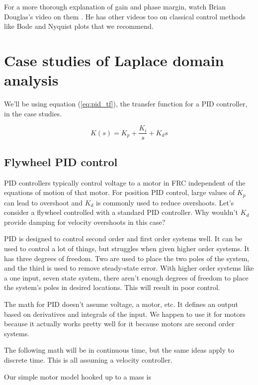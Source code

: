 For a more thorough explanation of gain and phase margin, watch Brian Douglas's
video on them \cite{bib:gain_phase_margin}. He has other videos too on classical
control methods like Bode and Nyquist plots that we recommend.

\section{Case studies of Laplace domain analysis}

We'll be using equation (\ref{eq:pid_tf}), the transfer function for a PID
controller, in the case studies.

\begin{equation}
  K(s) = K_p + \frac{K_i}{s} + K_ds \label{eq:pid_tf}
\end{equation}

\subsection{Flywheel PID control} \label{subsec:flywheel-pid-control}

PID controllers typically control voltage to a motor in FRC independent of the
equations of motion of that motor. For position PID control, large values of
$K_p$ can lead to overshoot and $K_d$ is commonly used to reduce overshoots.
Let's consider a flywheel controlled with a standard PID controller. Why
wouldn't $K_d$ provide damping for velocity overshoots in this case?

PID is designed to control second order and first order systems well. It can be
used to control a lot of things, but struggles when given higher order systems.
It has three degrees of freedom. Two are used to place the two poles of the
system, and the third is used to remove steady-state error. With higher order
systems like a one input, seven state system, there aren't enough degrees of
freedom to place the system's poles in desired locations. This will result in
poor control.

The math for PID doesn't assume voltage, a motor, etc. It defines an output
based on derivatives and integrals of the input. We happen to use it for motors
because it actually works pretty well for it because motors are second order
systems.

The following math will be in continuous time, but the same ideas apply to
discrete time. This is all assuming a velocity controller.

Our simple motor model hooked up to a mass is

